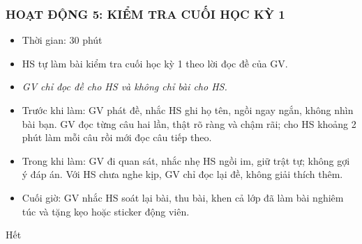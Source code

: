 \documentclass[../main.tex]{subfiles}
\begin{document}
\subsubsection{HOẠT ĐỘNG 5: KIỂM TRA CUỐI HỌC KỲ 1}
\begin{hd}
    \begin{itemize}
        \item Thời gian: 30 phút
        \item HS tự làm bài kiểm tra cuối học kỳ 1 theo lời đọc đề của GV.
    \end{itemize}
\end{hd}
\begin{itemize}
    \item \textit{GV chỉ đọc đề cho HS và không chỉ bài cho HS.}
    \item Trước khi làm: GV phát đề, nhắc HS ghi họ tên, ngồi ngay ngắn, không nhìn bài bạn. GV đọc từng câu hai lần, thật rõ ràng và chậm rãi; cho HS khoảng 2 phút làm mỗi câu rồi mới đọc câu tiếp theo.
    \item Trong khi làm: GV đi quan sát, nhắc nhẹ HS ngồi im, giữ trật tự; không gợi ý đáp án. Với HS chưa nghe kịp, GV chỉ đọc lại đề, không giải thích thêm.
    \item Cuối giờ: GV nhắc HS soát lại bài, thu bài, khen cả lớp đã làm bài nghiêm túc và tặng kẹo hoặc sticker động viên.
\end{itemize}

\begin{center}
       \faGg\faGg\quad Hết \quad\faGg\faGg
\end{center}
\end{document}
